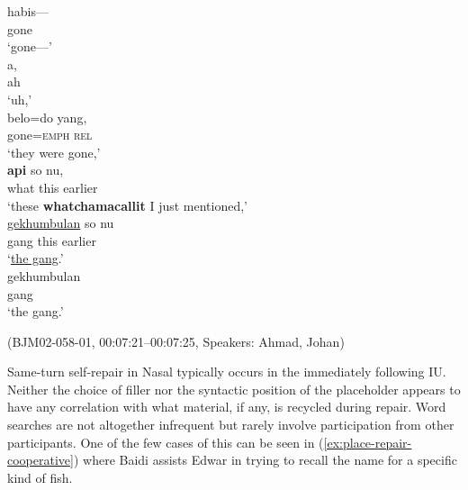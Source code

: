 \documentclass[output=paper,colorlinks,citecolor=brown
\ChapterDOI{10.5281/zenodo.15697585}
]{langscibook}
\begin{document}
\begin{exe}
    \ex\label{ex:repair-other} \begin{xlist}[0\quad →A:]
         \gll
        habis--- \\
        gone \\
        \glt `gone---' \\
        \exi{2\quad \hphantom{→A:}} \gll
        a, \\
        ah \\
        \glt `uh,' \\
        \exi{3\quad \hphantom{→A:}} \gll
        belo=do yang, \\
        gone=\textsc{emph} \textsc{rel} \\
        \glt `they were gone,' \\
         \gll
        \textbf{api} so nu, \\
        what this earlier \\
        \glt `these \textbf{whatchamacallit} I just mentioned,' \\
         \gll
        \uline{gekhumbulan} so nu \\
        gang this earlier \\
        \glt `\uline{the gang}.' \\
         \gll
        gekhumbulan \\
        gang \\
        \glt `the gang.' \\
    \end{xlist}
    \hfill (BJM02-058-01, 00:07:21–00:07:25, Speakers: Ahmad, Johan) 
\end{exe}

Same-turn self-repair in Nasal typically occurs in the immediately following IU. Neither the choice of filler nor the syntactic position of the placeholder appears to have any correlation with what material, if any, is recycled during repair. Word searches are not altogether infrequent but rarely involve participation from other participants. One of the few cases of this can be seen in (\ref{ex:place-repair-cooperative}) where Baidi assists Edwar in trying to recall the name for a specific kind of fish.
\end{document}

